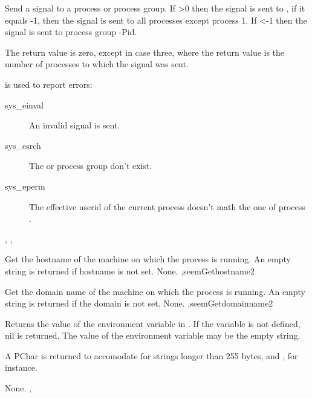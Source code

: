 { Send a signal  to a process or process group. If >0 then
the signal is sent to , if it equals -1, then the signal is sent to
all processes except process 1. If <-1 then the signal is sent to
process group -Pid.

The return value is zero, except in case three, where the return value is the
number of processes to which the signal was sent.
}
{ is used to report errors:
\begin{description}
\item[sys\_einval] An invalid signal is sent.
\item[sys\_esrch] The  or process group don't exist.
\item[sys\_eperm] The effective userid of the current process doesn't math
the one of process .
\end{description}
}
{, ,  }

{
Get the hostname of the machine on which the process is running.
An empty string is returned if hostname is not set.
}
{None.}
{ ,seem{Gethostname}{2} }



{
Get the domain name of the machine on which the process is running.
An empty string is returned if the domain is not set.
}
{None.}
{ ,seem{Getdomainname}{2} }



{Returns the value of the environment variable in . If the variable is
not defined, nil is returned. The value of the environment variable may be
the empty string.

A PChar is returned to accomodate for strings longer than 255 bytes,
 and , for instance.
}
{None.}
{,  }



